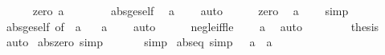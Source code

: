 \begin{isabellebody}
\ \ \ \ \isamarkupfalse%
\ zero{\isacharcolon}{\kern0pt}\ {\isachardoublequoteopen}{\isasymbar}a{\isasymbar}\ {\isacharequal}{\kern0pt}\ {}{\isachardoublequoteclose}\isanewline
\ \ \ \ \isamarkupfalse%
\ abs{\isacharunderscore}{\kern0pt}ge{\isacharunderscore}{\kern0pt}self\ \isamarkupfalse%
\ {\isachardoublequoteopen}a\ {\isasymle}\ {}{\isachardoublequoteclose}\ \isamarkupfalse%
\ auto\isanewline
\ \ \ \ \isamarkupfalse%
\ zero\ \isamarkupfalse%
\ {\isachardoublequoteopen}{\isasymbar}{\isacharminus}{\kern0pt}a{\isasymbar}\ {\isacharequal}{\kern0pt}\ {}{\isachardoublequoteclose}\ \isamarkupfalse%
\ simp\isanewline
\ \ \ \ \isamarkupfalse%
\ abs{\isacharunderscore}{\kern0pt}ge{\isacharunderscore}{\kern0pt}self\ {\isacharbrackleft}{\kern0pt}of\ {\isachardoublequoteopen}{\isacharminus}{\kern0pt}\ a{\isachardoublequoteclose}{\isacharbrackright}{\kern0pt}\ \isamarkupfalse%
\ {\isachardoublequoteopen}{\isacharminus}{\kern0pt}\ a\ {\isasymle}\ {}{\isachardoublequoteclose}\ \isamarkupfalse%
\ auto\isanewline
\ \ \ \ \isamarkupfalse%
\ neg{\isacharunderscore}{\kern0pt}le{\isacharunderscore}{\kern0pt}{}{\isacharunderscore}{\kern0pt}iff{\isacharunderscore}{\kern0pt}le\ \isamarkupfalse%
\ {\isachardoublequoteopen}{}\ {\isasymle}\ a{\isachardoublequoteclose}\ \isamarkupfalse%
\ auto\isanewline
\ \ \isamarkupfalse%
\isanewline
\ \ \isamarkupfalse%
\ \isamarkupfalse%
\ {\isacharquery}{\kern0pt}thesis\ \isamarkupfalse%
\ auto\isanewline
{}\isamarkupfalse%
%
\endisatagproof
{\isafoldproof}%
%
\isadelimproof
\isanewline
%
\endisadelimproof
\isanewline
{}\isamarkupfalse%
\ abs{\isacharunderscore}{\kern0pt}zero\ {\isacharbrackleft}{\kern0pt}simp{\isacharbrackright}{\kern0pt}{\isacharcolon}{\kern0pt}\ {\isachardoublequoteopen}{\isasymbar}{}{\isasymbar}\ {\isacharequal}{\kern0pt}\ {}{\isachardoublequoteclose}\isanewline
%
\isadelimproof
\ \ %
\endisadelimproof
%
\isatagproof
{}\isamarkupfalse%
\ simp%
\endisatagproof
{\isafoldproof}%
%
\isadelimproof
\isanewline
%
\endisadelimproof
\isanewline
{}\isamarkupfalse%
\ abs{\isacharunderscore}{\kern0pt}{}{\isacharunderscore}{\kern0pt}eq\ {\isacharbrackleft}{\kern0pt}simp{\isacharbrackright}{\kern0pt}{\isacharcolon}{\kern0pt}\ {\isachardoublequoteopen}{}\ {\isacharequal}{\kern0pt}\ {\isasymbar}a{\isasymbar}\ {\isasymlongleftrightarrow}\ a\ {\isacharequal}{\kern0pt}\ {}{\isachardoublequoteclose}\isanewline

\end{isabellebody}
